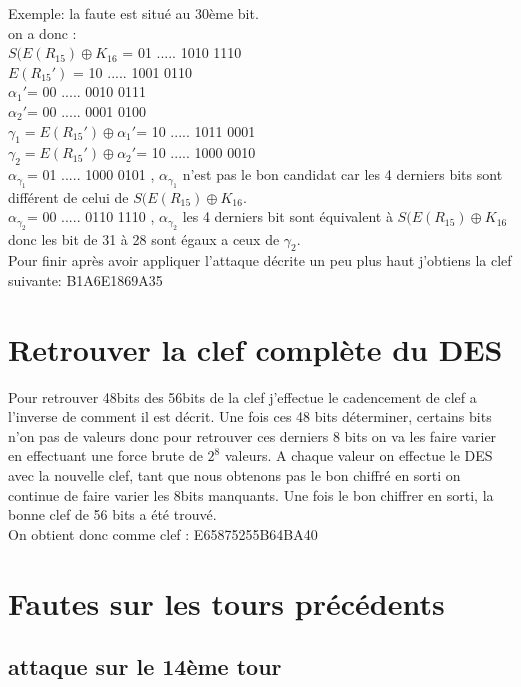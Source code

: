 \documentclass[a4paper]{report}
\begin{document}
			Exemple: la faute est situé au 30ème bit.\\
			
			on a donc :\\
			$S(E(R_{15})\oplus K_{16}$ = 01 ..... 1010 1110\\
			$E(R_{15}')$ = 10 ..... 1001 0110\\
			$\alpha_1'$= 00 ..... 0010 0111\\
			$\alpha_2'$= 00 ..... 0001 0100\\
			$\gamma_1=E(R_{15}')\oplus \alpha_1'$= 10 ..... 1011 0001\\
			$\gamma_2=E(R_{15}')\oplus \alpha_2'$= 10 ..... 1000 0010\\
			$\alpha_{\gamma_1}$= 01 ..... 1000 0101 , $\alpha_{\gamma_1}$ n'est pas le bon candidat car les 4 derniers bits sont différent de celui de $S(E(R_{15})\oplus K_{16}$.\\
			$\alpha_{\gamma_2}$= 00 ..... 0110 1110 , $\alpha_{\gamma_2}$ les 4 derniers bit sont équivalent à $S(E(R_{15})\oplus K_{16}$ donc les bit de 31 à 28 sont égaux a ceux de $\gamma_2$.\\
			
			Pour finir après avoir appliquer l'attaque décrite un peu plus haut j'obtiens la clef suivante: B1A6E1869A35
		\chapter{Retrouver la clef complète du DES}
			Pour retrouver 48bits des 56bits de la clef j'effectue le cadencement de clef a l'inverse de comment il est décrit.
			Une fois ces 48 bits déterminer, certains bits n'on pas de valeurs donc pour retrouver ces derniers 8 bits on va les faire varier en effectuant une force brute de $2^{8}$ valeurs. A chaque valeur on effectue le DES avec la nouvelle clef, tant que nous obtenons pas le bon chiffré en sorti on continue de faire varier les 8bits manquants. Une fois le bon chiffrer en sorti, la bonne clef de 56 bits a été trouvé.\\
			
			On obtient donc comme clef : E65875255B64BA40
		
		\chapter{Fautes sur les tours précédents}
			\section{attaque sur le 14ème tour}
\end{document}
